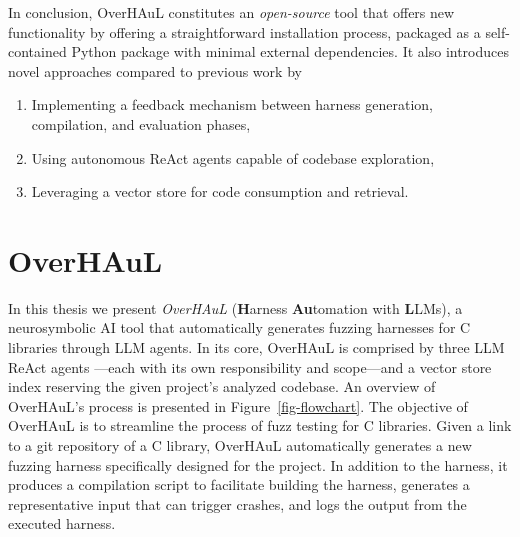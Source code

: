 \documentclass[
  a4paper,
  DIV=11,
  numbers=noendperiod]{scrreprt}
\providecommand{\tightlist}{%
  \setlength{\itemsep}{0pt}\setlength{\parskip}{0pt}}
\theoremstyle{definition}
\theoremstyle{remark}
\begin{document}
In conclusion, OverHAuL constitutes an \emph{open-source} tool that
offers new functionality by offering a straightforward installation
process, packaged as a self-contained Python package with minimal
external dependencies. It also introduces novel approaches compared to
previous work by

\begin{enumerate}
\def\labelenumi{\arabic{enumi}.}
\tightlist
\item
  Implementing a feedback mechanism between harness generation,
  compilation, and evaluation phases,
\item
  Using autonomous ReAct agents capable of codebase exploration,
\item
  Leveraging a vector store for code consumption and retrieval.
\end{enumerate}


\chapter{OverHAuL}\label{overhaul}

In this thesis we present \emph{OverHAuL} (\textbf{H}arness
\textbf{Au}tomation with \textbf{L}LMs), a neurosymbolic AI tool that
automatically generates fuzzing harnesses for C libraries through LLM
agents. In its core, OverHAuL is comprised by three LLM ReAct agents
\autocite{reAct}---each with its own responsibility and scope---and a
vector store index reserving the given project's analyzed codebase. An
overview of OverHAuL's process is presented in
Figure~\ref{fig-flowchart}. The objective of OverHAuL is to streamline
the process of fuzz testing for C libraries. Given a link to a git
repository \autocite{torvalds2005} of a C library, OverHAuL
automatically generates a new fuzzing harness specifically designed for
the project. In addition to the harness, it produces a compilation
script to facilitate building the harness, generates a representative
input that can trigger crashes, and logs the output from the executed
harness.
\end{document}
